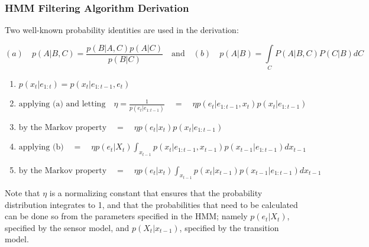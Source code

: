 \subsubsection{HMM Filtering Algorithm Derivation} 
\label{section:HMMFiltering}
Two well-known probability identities are used in the derivation: 
\begin{center}
\end{center}
\[(a) \quad p(A | B, C) = \frac{p(B | A, C) p(A | C)}{p(B | C)} \quad \text{and} \quad (b) \quad p(A | B) = \int\limits_{C}P(A | B, C) P(C | B)dC\]

\begin{center}
\end{center}

\begin{enumerate}
\item {$ p(x_t | e_{1:t}) = p(x_t | e_{1:t-1}, e_t) $ }

\item{$ \text{applying (a) and letting} \quad \eta = \frac{1}{p(e_t | e_{1:t-1})} \quad = \quad \eta p(e_t | e_{1:t-1}, x_t)p(x_t|e_{1:t-1}) $ }

\item{$ \text{by the Markov property} \quad = \quad \eta p(e_t | x_t)p(x_t|e_{1:t-1})$}

\item{$\text{applying (b)} \quad =  \quad \eta p(e_t | X_t)\int_{x_{t-1}}p(x_t|e_{1:t-1}, x_{t-1}) p(x_{t-1}|e_{1:t-1})dx_{t-1}$}

\item{$ \text{by the Markov property} \quad = \quad \eta p(e_t | x_t)\int_{x_{t-1}}p(x_t|x_{t-1}) p(x_{t-1}|e_{1:t-1})dx_{t-1} $}

\end{enumerate}
Note that $\eta$ is a normalizing constant that ensures that the probability distribution integrates to 1, and that the probabilities that need to be calculated can be done so from the parameters specified in the HMM; namely $p(e_t | X_t)$, specified by the sensor model, and $p(X_t | x_{t-1})$, specified by the transition model.

